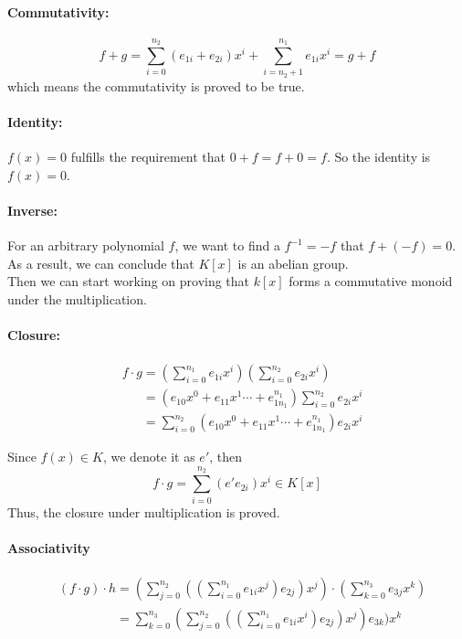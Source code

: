 \documentclass[11pt]{article}
\begin{document}
			\paragraph{Commutativity:}
				\[f + g = \sum_{i = 0}^{n_2} (e_{1i} + e_{2i})x^i + \sum_{i = n_2 + 1}^{n_1} e_{1i}x^i  = g + f\]
			which means the commutativity is proved to be true.
			
			\paragraph{Identity:} $f(x) = 0$ fulfills the requirement that $0 + f = f + 0 = f$. So the identity is $f(x) = 0$.
			
			\paragraph{Inverse:} For an arbitrary polynomial $f$, we want to find a $f^{-1} = -f$ that $f + (-f) = 0$.\\
			
			
			As a result, we can conclude that $K[x]$ is an abelian group.\\
			
			Then we can start working on proving that $k[x]$ forms a commutative monoid under the multiplication.
			
			\paragraph{Closure:}
				\begin{align}
					&f \cdot g = (\sum_{i = 0}^{n_1} e_{1i}x^i)(\sum_{i = 0}^{n_2} e_{2i}x^i)\nonumber\\
					&\phantom{f \cdot g} = (e_{10}x^0 + e_{11}x^1 \cdots + e_{1n_1}^{n_1})\sum_{i = 0}^{n_2} e_{2i}x^i\nonumber\\
					&\phantom{f \cdot g} = \sum_{i = 0}^{n_2} (e_{10}x^0 + e_{11}x^1 \cdots + e_{1n_1}^{n_1})e_{2i}x^i\nonumber
				\end{align}
				
				Since $f(x) \in K$, we denote it as $e'$, then \[f \cdot g = \sum_{i = 0}^{n_2} (e'e_{2i})x^i \in K[x]\]
				Thus, the closure under multiplication is proved.
				
				\paragraph{Associativity}
				\begin{align}
					&(f \cdot g) \cdot h = (\sum_{j = 0}^{n_2} ((\sum_{i = 0}^{n_1} e_{1i}x^j)e_{2j})x^j) \cdot (\sum_{k = 0}^{n_3} e_{3j}x^k)\nonumber\\
					&\phantom{(f \cdot g) \cdot h} = \sum_{k = 0}^{n_3}(\sum_{j = 0}^{n_2} ((\sum_{i = 0}^{n_1} e_{1i}x^i)e_{2j})x^j)e_{3k})x^k\nonumber
				\end{align}
				
\end{document}
